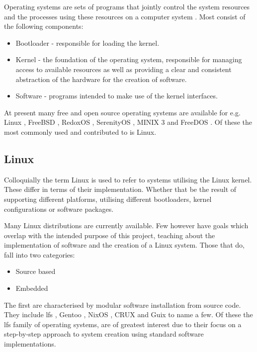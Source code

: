 Operating systems are sets of programs that jointly control the system resources and the processes using these resources on a computer system \cite{oxford-os,cambridge-os}. Most consist of the following components:


\begin{itemize}
    \item Bootloader - responsible for loading the kernel.
    \item Kernel - the foundation of the operating system, responsible for managing access to available resources as well as providing a clear and consistent abstraction of the hardware for the creation of software.
    \item Software - programs intended to make use of the kernel interfaces.
\end{itemize}

At present many free and open source operating systems are available for e.g. Linux \cite{linux}, FreeBSD \cite{freebsd}, RedoxOS \cite{redox}, SerenityOS \cite{serenity}, MINIX 3 \cite{minix3} and FreeDOS \cite{freedos}. Of these the most commonly used and contributed to is Linux.

\subsection{Linux}

Colloquially the term Linux is used to refer to systems utilising the Linux kernel. These differ in terms of their implementation. Whether that be the result of supporting different platforms, utilising different bootloaders, kernel configurations or software packages.

Many Linux distributions are currently available. Few however have goals which overlap with the intended purpose of this project, teaching about the implementation of software and the creation of a Linux system. Those that do, fall into two categories:

\begin{itemize}
    \item Source based
    \item Embedded
\end{itemize}

The first are characterised by modular software installation from source code. They include \gls{lfs} \cite{lfs}, Gentoo \cite{gentoo}, NixOS \cite{nixos}, CRUX \cite{crux} and  Guix \cite{guix} to name a few. Of these the \gls{lfs} family of operating systems, are of greatest interest due to their focus on a step-by-step approach to system creation using standard software implementations.

